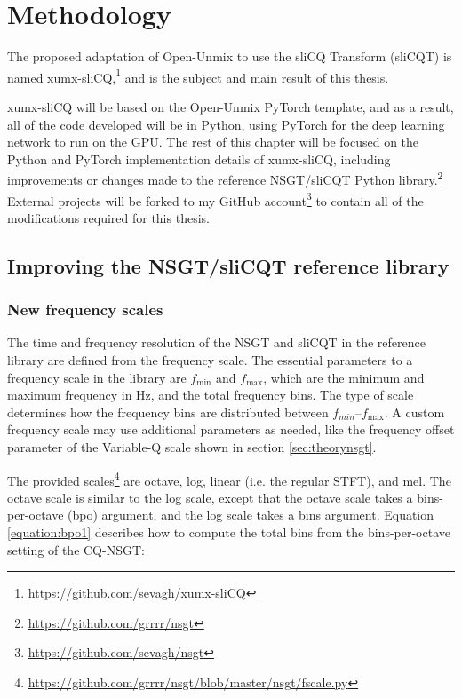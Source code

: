 \documentclass[report.tex]{subfiles}
\begin{document}
\section{Methodology}
\label{sec:methodology}

The proposed adaptation of Open-Unmix to use the sliCQ Transform (sliCQT) is named xumx-sliCQ,\footnote{\url{https://github.com/sevagh/xumx-sliCQ}} and is the subject and main result of this thesis.

xumx-sliCQ will be based on the Open-Unmix PyTorch template, and as a result, all of the code developed will be in Python, using PyTorch for the deep learning network to run on the GPU. The rest of this chapter will be focused on the Python and PyTorch implementation details of xumx-sliCQ, including improvements or changes made to the reference NSGT/sliCQT Python library.\footnote{\url{https://github.com/grrrr/nsgt}} External projects will be forked to my GitHub account\footnote{\url{https://github.com/sevagh/nsgt}} to contain all of the modifications required for this thesis.

\subsection{Improving the NSGT/sliCQT reference library}
\label{sec:improvelib}

\subsubsection{New frequency scales}
\label{sec:freqscales}

The time and frequency resolution of the NSGT and sliCQT in the reference library are defined from the frequency scale. The essential parameters to a frequency scale in the library are $f_{\text{min}}$ and $f_{\text{max}}$, which are the minimum and maximum frequency in Hz, and the total frequency bins. The type of scale determines how the frequency bins are distributed between $f_{min}$--$f_{\text{max}}$. A custom frequency scale may use additional parameters as needed, like the frequency offset parameter of the Variable-Q scale shown in section \ref{sec:theorynsgt}.

The provided scales\footnote{\url{https://github.com/grrrr/nsgt/blob/master/nsgt/fscale.py}} are octave, log, linear (i.e. the regular STFT), and mel. The octave scale is similar to the log scale, except that the octave scale takes a bins-per-octave (bpo) argument, and the log scale takes a bins argument. Equation \eqref{equation:bpo1} describes how to compute the total bins from the bins-per-octave setting of the CQ-NSGT:
\end{document}
